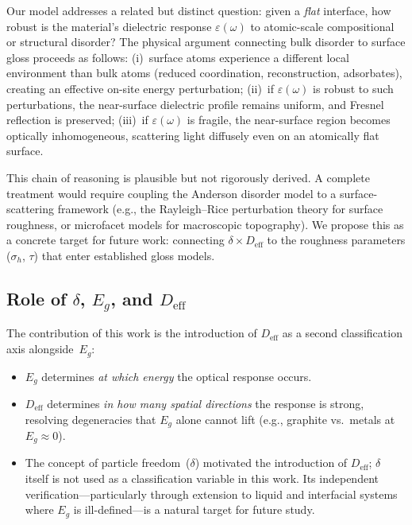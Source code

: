 \documentclass[twocolumn,showpacs,preprintnumbers,amsmath,amssymb,prb]{revtex4-2}
\begin{document}
Our model addresses a related but distinct question: given a
\emph{flat} interface, how robust is the material's dielectric
response $\varepsilon(\omega)$ to atomic-scale compositional or
structural disorder? The physical argument connecting bulk disorder
to surface gloss proceeds as follows: (i)~surface atoms experience
a different local environment than bulk atoms (reduced coordination,
reconstruction, adsorbates), creating an effective on-site energy
perturbation; (ii)~if $\varepsilon(\omega)$ is robust to such
perturbations, the near-surface dielectric profile remains uniform,
and Fresnel reflection is preserved; (iii)~if $\varepsilon(\omega)$
is fragile, the near-surface region becomes optically inhomogeneous,
scattering light diffusely even on an atomically flat surface.

This chain of reasoning is plausible but not rigorously derived.
A complete treatment would require coupling the Anderson disorder
model to a surface-scattering framework (e.g., the Rayleigh--Rice
perturbation theory for surface roughness, or microfacet models for
macroscopic topography). We propose this as a concrete target for
future work: connecting $\delta \times D_\mathrm{eff}$ to the
roughness parameters ($\sigma_h$, $\tau$) that enter established
gloss models.

\subsection{Role of $\delta$, $E_g$, and $D_\mathrm{eff}$}

The contribution of this work is the introduction of $D_\mathrm{eff}$
as a second classification axis alongside~$E_g$:
\begin{itemize}
  \item $E_g$ determines \emph{at which energy} the optical response
    occurs.
  \item $D_\mathrm{eff}$ determines \emph{in how many spatial
    directions} the response is strong, resolving degeneracies that
    $E_g$ alone cannot lift (e.g., graphite vs.\ metals at
    $E_g \approx 0$).
  \item The concept of particle freedom~($\delta$) motivated the
    introduction of $D_\mathrm{eff}$; $\delta$ itself is not used as
    a classification variable in this work. Its independent
    verification---particularly through extension to liquid and
    interfacial systems where $E_g$ is ill-defined---is a natural
    target for future study.
\end{itemize}
\end{document}
